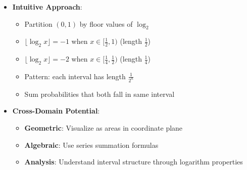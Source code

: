 \documentclass[11pt]{article}
\begin{document}
\begin{problemconfigbox}
\begin{itemize}[leftmargin=*]
    \item \textbf{Intuitive Approach}: 
    \begin{itemize}
        \item Partition $(0,1)$ by floor values of $\log_2$
        \item $\lfloor\log_2 x\rfloor = -1$ when $x \in [\frac{1}{2}, 1)$ (length $\frac{1}{2}$)
        \item $\lfloor\log_2 x\rfloor = -2$ when $x \in [\frac{1}{4}, \frac{1}{2})$ (length $\frac{1}{4}$)
        \item Pattern: each interval has length $\frac{1}{2^n}$
        \item Sum probabilities that both fall in same interval
    \end{itemize}
    
    \item \textbf{Cross-Domain Potential}: 
    \begin{itemize}
        \item \textbf{Geometric}: Visualize as areas in coordinate plane
        \item \textbf{Algebraic}: Use series summation formulas
        \item \textbf{Analysis}: Understand interval structure through logarithm properties
    \end{itemize}
\end{itemize}
\end{problemconfigbox}
\end{document}
